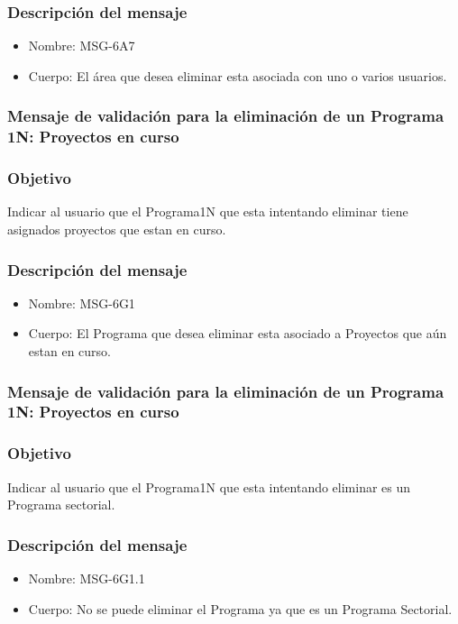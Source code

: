  \subsubsection{Descripción del mensaje}
 \begin{itemize}
 \item Nombre: MSG-6A7
 \item Cuerpo: El área que desea eliminar esta asociada con uno o varios usuarios.
 \end{itemize}


\subsubsection{Mensaje de validación para la eliminación de un Programa 1N: Proyectos en curso} \label{MSG-6G1}
 
 \subsubsection{Objetivo}
 Indicar al usuario que el Programa1N que esta intentando eliminar tiene asignados proyectos que estan en curso.

 \subsubsection{Descripción del mensaje}
 \begin{itemize}
 \item Nombre: MSG-6G1
 \item Cuerpo: El Programa que desea eliminar esta asociado a Proyectos que aún estan en curso.
 \end{itemize}

\subsubsection{Mensaje de validación para la eliminación de un Programa 1N: Proyectos en curso} \label{MSG-6G1.1}
 
 \subsubsection{Objetivo}
 Indicar al usuario que el Programa1N que esta intentando eliminar es un Programa sectorial.

 \subsubsection{Descripción del mensaje}
 \begin{itemize}
 \item Nombre: MSG-6G1.1
 \item Cuerpo: No se puede eliminar el Programa ya que es un Programa Sectorial.
 \end{itemize}

